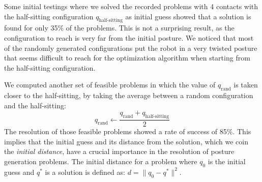 Some initial testings where we solved the recorded problems with 4 contacts with the half-sitting configuration $q_\text{half-sitting}$ as initial guess showed that a solution is found for only 35\% of the problems.
This is not a surprising result, as the configuration to reach is very far from the initial posture.
We noticed that most of the randomly generated configurations put the robot in a very twisted posture that seems difficult to reach for the optimization algorithm when starting from the half-sitting configuration.


We computed another set of feasible problems in which the value of $q_\text{rand}$ is taken closer to the half-sitting, by taking the average between a random configuration and the half-sitting:
\begin{equation}
  q_\text{rand} \leftarrow \frac{q_\text{rand}+q_\text{half-sitting}}{2}
\end{equation}
The resolution of those feasible problems showed a rate of success of 85\%.
This implies that the initial guess and its distance from the solution, which we coin the \emph{initial distance}, have a crucial importance in the resolution of posture generation problems.
The initial distance for a problem where $q_0$ is the initial guess and $q^*$ is a solution is defined as: $d=\|q_0-q^*\|^2$.



